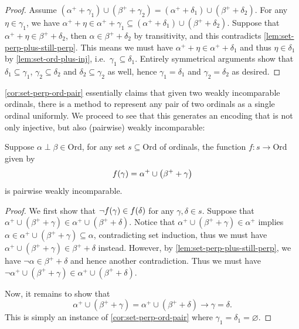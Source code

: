 \documentclass[12pt,openany]{book}
\theoremstyle{plain}
\theoremstyle{definition}
\newcommand\Ord{\mathrm{Ord}}
\begin{document}
\begin{proof}
  Assume $\left(\alpha^+ + \gamma_1\right) \cup \left(\beta^+ + \gamma_2\right) = \left(\alpha^+ + \delta_1\right) \cup \left(\beta^+ + \delta_2\right)$. For any $\eta \in \gamma_1$, we have $\alpha^+ + \eta \in \alpha^+ + \gamma_1 \subseteq \left(\alpha^+ + \delta_1\right) \cup \left(\beta^+ + \delta_2\right)$. Suppose that $\alpha^+ + \eta \in \beta^+ + \delta_2$, then $\alpha \in \beta^+ + \delta_2$ by transitivity, and this contradicts \autoref{lem:set-perp-plus-still-perp}. This means we must have $\alpha^+ + \eta \in \alpha^+ + \delta_1$ and thus $\eta \in \delta_1$ by \autoref{lem:set-ord-plus-inj}, i.e.\ $\gamma_1 \subseteq \delta_1$. Entirely symmetrical arguments show that $\delta_1 \subseteq \gamma_1$, $\gamma_2 \subseteq \delta_2$ and $\delta_2 \subseteq \gamma_2$ as well, hence $\gamma_1 = \delta_1$ and $\gamma_2 = \delta_2$ as desired.
\end{proof}

\autoref{cor:set-perp-ord-pair} essentially claims that given two weakly incomparable ordinals, there is a method to represent any pair of two ordinals as a single ordinal uniformly. We proceed to see that this generates an encoding that is not only injective, but also (pairwise) weakly incomparable:
\begin{proposition}
  \label{prop:set-perp-ineq-to-perp}
  Suppose $\alpha \perp \beta \in \Ord$, for any set $s \subseteq \Ord$ of ordinals, the function $f : s \rightarrow \Ord$ given by
  \[f\mleft(\gamma\mright) = \alpha^+ \cup \left(\beta^+ + \gamma\right)\]
  is pairwise weakly incomparable.
\end{proposition}

\begin{proof}
  We first show that $\neg f\mleft(\gamma\mright) \in f\mleft(\delta\mright)$ for any $\gamma, \delta \in s$. Suppose that $\alpha^+ \cup \left(\beta^+ + \gamma\right) \in \alpha^+ \cup \left(\beta^+ + \delta\right)$. Notice that $\alpha^+ \cup \left(\beta^+ + \gamma\right) \in \alpha^+$ implies $\alpha \in \alpha^+ \cup \left(\beta^+ + \gamma\right) \subseteq \alpha$, contradicting set induction, thus we must have $\alpha^+ \cup \left(\beta^+ + \gamma\right) \in \beta^+ + \delta$ instead. However, by \autoref{lem:set-perp-plus-still-perp}, we have $\neg \alpha \in \beta^+ + \delta$ and hence another contradiction. Thus we must have $\neg \alpha^+ \cup \left(\beta^+ + \gamma\right) \in \alpha^+ \cup \left(\beta^+ + \delta\right)$.

  Now, it remains to show that
  \[\alpha^+ \cup \left(\beta^+ + \gamma\right) = \alpha^+ \cup \left(\beta^+ + \delta\right) \rightarrow \gamma = \delta.\]
  This is simply an instance of \autoref{cor:set-perp-ord-pair} where $\gamma_1 = \delta_1 = \varnothing$.
\end{proof}
\end{document}
